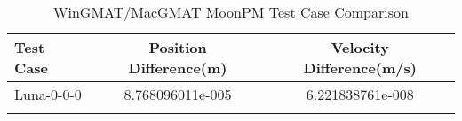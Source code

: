 \begin{table}[htbp!]
\centering
\caption{ WinGMAT/MacGMAT MoonPM Test Case Comparison}
      \begin{tabular}{lcc}
      \hline\hline
          Test Case & Position Difference(m) & Velocity Difference(m/s) \\
         \hline
         Luna-0-0-0 & 8.768096011e-005 & 6.221838761e-008 \\
      \hline\hline
      \label{Table: MoonPM WinGMAT-MacGMAT Table} 
\end{tabular}
\end{table}

